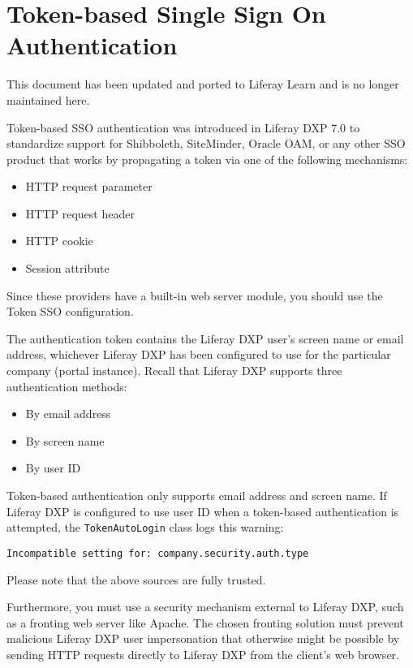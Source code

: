 \chapter{Token-based Single Sign On
Authentication}\label{token-based-single-sign-on-authentication}

{This document has been updated and ported to Liferay Learn and is no
longer maintained here.}

Token-based SSO authentication was introduced in Liferay DXP 7.0 to
standardize support for Shibboleth, SiteMinder, Oracle OAM, or any other
SSO product that works by propagating a token via one of the following
mechanisms:

\begin{itemize}
\tightlist
\item
  HTTP request parameter
\item
  HTTP request header
\item
  HTTP cookie
\item
  Session attribute
\end{itemize}

Since these providers have a built-in web server module, you should use
the Token SSO configuration.

The authentication token contains the Liferay DXP user's screen name or
email address, whichever Liferay DXP has been configured to use for the
particular company (portal instance). Recall that Liferay DXP supports
three authentication methods:

\begin{itemize}
\tightlist
\item
  By email address
\item
  By screen name
\item
  By user ID
\end{itemize}

Token-based authentication only supports email address and screen name.
If Liferay DXP is configured to use user ID when a token-based
authentication is attempted, the \texttt{TokenAutoLogin} class logs this
warning:

\begin{verbatim}
Incompatible setting for: company.security.auth.type
\end{verbatim}

Please note that the above sources are fully trusted.

Furthermore, you must use a security mechanism external to Liferay DXP,
such as a fronting web server like Apache. The chosen fronting solution
must prevent malicious Liferay DXP user impersonation that otherwise
might be possible by sending HTTP requests directly to Liferay DXP from
the client's web browser.

